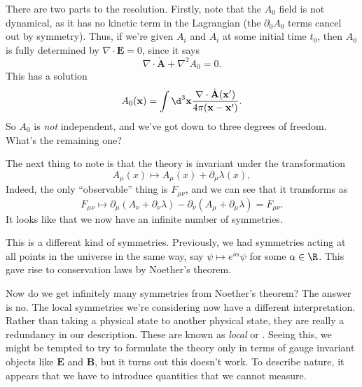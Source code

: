 \documentclass[a4paper]{article}
\begin{document}
There are two parts to the resolution. Firstly, note that the $A_0$ field is not dynamical, as it has no kinetic term in the Lagrangian (the $\partial_0 A_0$ terms cancel out by symmetry). Thus, if we're given $A_i$ and $\dot{A}_i$ at some initial time $t_0$, then $A_0$ is fully determined by $\nabla \cdot \mathbf{E} = 0$, since it says
\[
  \nabla \cdot \dot{\mathbf{A}} + \nabla^2 A_0 = 0.
\]
This has a solution
\[
  A_0(\mathbf{x}) = \int \d^3 \mathbf{x} \frac{\nabla \cdot \dot{\mathbf{A}}(\mathbf{x}')}{4\pi(\mathbf{x} - \mathbf{x}')}.
\]
So $A_0$ is \emph{not} independent, and we've got down to three degrees of freedom. What's the remaining one?

The next thing to note is that the theory is invariant under the transformation
\[
  A_\mu (x) \mapsto A_\mu(x) + \partial_\mu \lambda(x),
\]
Indeed, the only ``observable'' thing is $F_{\mu\nu}$, and we can see that it transforms as
\[
  F_{\mu\nu} \mapsto \partial_\mu (A_\nu + \partial_\nu \lambda) - \partial_\nu(A_\mu + \partial_\mu \lambda) = F_{\mu\nu}.
\]
It looks like that we now have an infinite number of symmetries.

This is a different kind of symmetries. Previously, we had symmetries acting at all points in the universe in the same way, say $\psi \mapsto e^{i\alpha}\psi$ for some $\alpha \in \R$. This gave rise to conservation laws by Noether's theorem.

Now do we get infinitely many symmetries from Noether's theorem? The answer is no. The local symmetries we're considering now have a different interpretation. Rather than taking a physical state to another physical state, they are really a redundancy in our description. These are known as \emph{local} or .
%
%
%
%
Seeing this, we might be tempted to try to formulate the theory only in terms of gauge invariant objects like $\mathbf{E}$ and $\mathbf{B}$, but it turns out this doesn't work. To describe nature, it appears that we have to introduce quantities that we cannot measure.
\end{document}
